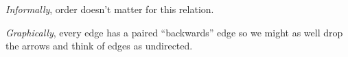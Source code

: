 
{\it Informally}, order doesn't matter for this relation.

{\it Graphically}, every edge has a paired ``backwards'' edge so we might
as well drop the arrows and think of edges as undirected.
